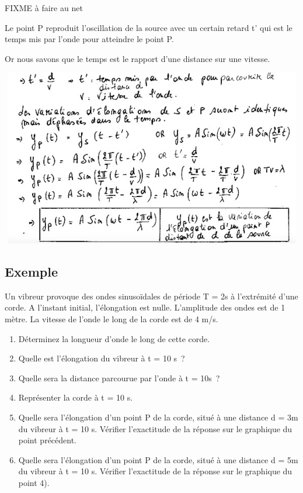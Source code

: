 FIXME à faire au net

Le point P reproduit l'oscillation de la source avec un certain retard
t' qui est le temps mis par l'onde pour atteindre le point P.

Or nous savons que le temps est le rapport d'une distance sur une
vitesse.

\includegraphics[width=14.152cm,height=7.717cm]{Pictures/100000010000039C0000022244D6A7EE40B9357C.png}

\subsection{Exemple}

Un vibreur provoque des ondes sinusoïdales de période T = 2s à
l'extrémité d'une corde. A l'instant initial, l'élongation est nulle.
L'amplitude des ondes est de 1 mètre. La vitesse de l'onde le long de la
corde est de 4 m/s.

\begin{enumerate}
\item  Déterminez la longueur d'onde le long de cette corde.
\item  Quelle est l'élongation du vibreur à t = 10 s~?
\item  Quelle sera la distance parcourue par l'onde à t = 10s~?
\item  Représenter la corde à t = 10 s.
\item  Quelle sera l'élongation d'un point P de la corde, situé à une
  distance d = 3m du vibreur à t = 10 s.
Vérifier l'exactitude de la réponse sur le graphique du point précédent.
\item  Quelle sera l'élongation d'un point P de la corde, situé à une
  distance d = 5m du vibreur à t = 10 s.
Vérifier l'exactitude de la réponse sur le graphique du point 4).
\end{enumerate}

